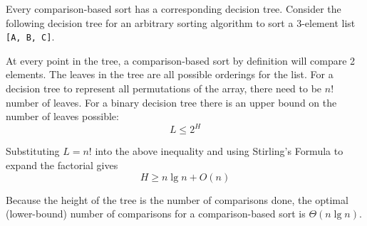 \documentclass[11pt]{article}
\begin{document}
	Every comparison-based sort has a corresponding decision tree. Consider the following decision tree for an arbitrary sorting algorithm to sort a 3-element list \verb|[A, B, C]|.
	
	\begin{center}
	\end{center}
	At every point in the tree, a comparison-based sort by definition will compare 2 elements. The leaves in the tree are all possible orderings for the list. For a decision tree to represent all permutations of the array, there need to be $n!$ number of leaves. For a binary decision tree there is an upper bound on the number of leaves possible:
	\begin{equation}
		L \leq 2^H
	\end{equation}
	
	Substituting $L = n!$ into the above inequality and using Stirling's Formula to expand the factorial gives
	\begin{equation}
		H \geq n\lg n + O(n)
	\end{equation}
	
	Because the height of the tree is the number of comparisons done, the optimal (lower-bound) number of comparisons for a comparison-based sort is $\Theta(n\lg n)$.
\end{document}
